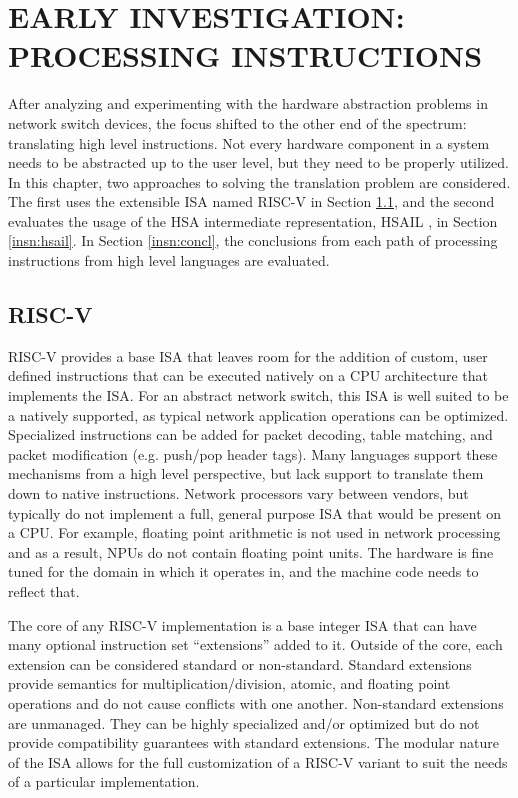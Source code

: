 \chapter{EARLY INVESTIGATION: PROCESSING INSTRUCTIONS}
\label{insn}
After analyzing and experimenting with the hardware abstraction problems in
network switch devices, the focus shifted to the other end of the spectrum:
translating high level instructions. Not every hardware component in a system
needs to be abstracted up to the user level, but they need to be properly
utilized. In this chapter, two approaches to solving the translation problem
are considered. The first uses the extensible ISA named RISC-V in Section
\ref{insn:riscv}, and the second evaluates the usage of the HSA intermediate
representation, HSAIL \cite{hsail}, in Section \ref{insn:hsail}. In Section
\ref{insn:concl}, the conclusions from each path of processing instructions
from high level languages are evaluated.

\section{RISC-V}
\label{insn:riscv}
RISC-V provides a base ISA that leaves room for the addition of custom, user
defined instructions that can be executed natively on a CPU architecture that
implements the ISA. For an abstract network switch, this ISA is well suited to
be a natively supported, as typical network application operations can be
optimized. Specialized instructions can be added for packet decoding, table
matching, and packet modification (e.g. push/pop header tags). Many languages
support these mechanisms from a high level perspective, but lack support to
translate them down to native instructions. Network processors vary between
vendors, but typically do not implement a full, general purpose ISA that would
be present on a CPU. For example, floating point arithmetic is not used in
network processing and as a result, NPUs do not contain floating point units.
The hardware is fine tuned for the domain in which it operates in, and the
machine code needs to reflect that.

The core of any RISC-V implementation is a base integer ISA that can have many
optional instruction set ``extensions'' added to it. Outside of the core, each
extension can be considered standard or non-standard. Standard extensions
provide semantics for multiplication/division, atomic, and floating point
operations and do not cause conflicts with one another. Non-standard extensions
are unmanaged. They can be highly specialized and/or optimized but do not
provide compatibility guarantees with standard extensions. The modular nature
of the ISA allows for the full customization of a RISC-V variant to suit the
needs of a particular implementation.

